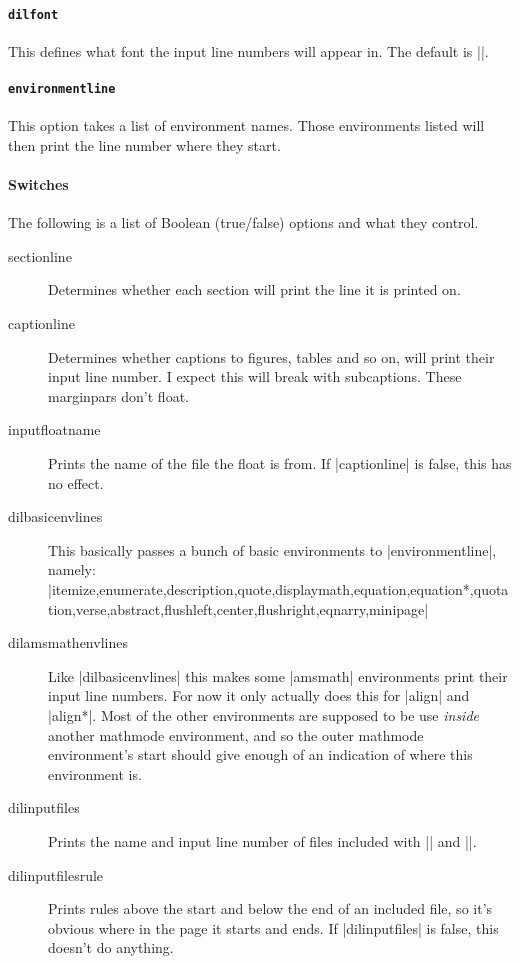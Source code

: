 \documentclass{scrartcl}
\begin{document}
\paragraph{\lstinline+dilfont+}

This defines what font the input line numbers will appear in.
The default is |\ttfamily|.

\paragraph{\lstinline+environmentline+}

This option takes a list of environment names.
Those environments listed will then print the line number where they
start.

\paragraph{Switches}

The following is a list of Boolean (true/false) options and what they
control.
\begin{description}
\item[sectionline] Determines whether each section will print the line
  it is printed on.
\item[captionline] Determines whether captions to figures, tables and
  so on, will print their input line number.
  I expect this will break with subcaptions.
  These marginpars don't float.
\item[inputfloatname] Prints the name of the file the float is from.
  If |captionline| is false, this has no effect.
\item[dilbasicenvlines] This basically passes a bunch of basic
  environments to |environmentline|, namely:
  |itemize,enumerate,description,quote,displaymath,equation,equation*,quotation,verse,abstract,flushleft,center,flushright,eqnarry,minipage|
\item[dilamsmathenvlines] Like |dilbasicenvlines| this makes some
  |amsmath| environments print their input line numbers.
  For now it only actually does this for |align| and |align*|.
  Most of the other environments are supposed to be use \emph{inside}
  another mathmode environment, and so the outer mathmode
  environment's start should give enough of an indication of where
  this environment is.
\item[dilinputfiles] Prints the name and input line number of files
  included with || and ||.
\item[dilinputfilesrule] Prints rules above the start and below the
  end of an included file, so it's obvious where in the page it starts
  and ends.
  If |dilinputfiles| is false, this doesn't do anything.
\end{description}
\end{document}
